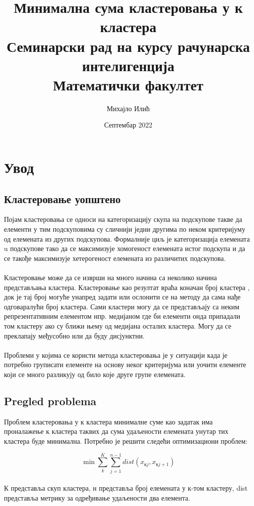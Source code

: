 \documentclass{article}
\title{Минимална сума кластеровања у к кластера\\ \small{Семинарски рад на курсу рачунарска интелигенција \\Математички факултет}}
\author{Михајло Илић}
\date{Септембар 2022}
\begin{document}
\maketitle

\tableofcontents

\newpage
\section{Увод}
\subsection{Кластеровање уопштено}
Појам кластеровања се односи на категоризацију скупа на подскупове такве да елементи у тим подскуповима су сличнији једни другима по неком критеријуму од елемената из других подскупова. Формалније циљ је категоризација елемената u подскупове тако да се максимизује хомогеност елемената истог подскупа и да се такође максимизује хетерогеност елемената из различитих подскупова.\\\\Кластеровање може да се изврши на много начина са неколико начина представљања кластера. Кластеровање као резултат враћа коначан број кластера , док је тај број могуће унапред задати или ослонити се на методу да сама нађе одговаралући број кластера. Сами кластери могу да се представљају са неким репрезентативним елементом нпр. медијаном где би елементи онда припадали том кластеру ако су ближи њему од медијана осталих кластера. Могу да се преклапају међусобно или да буду дисјунктни.\\\\Проблеми у којима се користи метода кластеровања је у ситуацији када је потребно груписати елементе на основу неког критеријума или уочити елементе који се много разликују од било које друге групе елемената.

\subsection{Pregled problema}
Проблем кластеровања у к кластера минималне суме као задатак има проналажење к кластера таквих да сума удаљености елемената унутар тих кластера буде минимална. Потребно је решити следећи оптимизациони проблем:

\begin{displaymath}
\min \sum_{k}^{K}\sum_{j=1}^{n-1}dist(x_{кj},x_{кj+1})
\end{displaymath}
\\К представља скуп кластера, н представља број елемената у к-том кластеру, dist представља метрику за одређивање удаљености два елемента.
\end{document}
